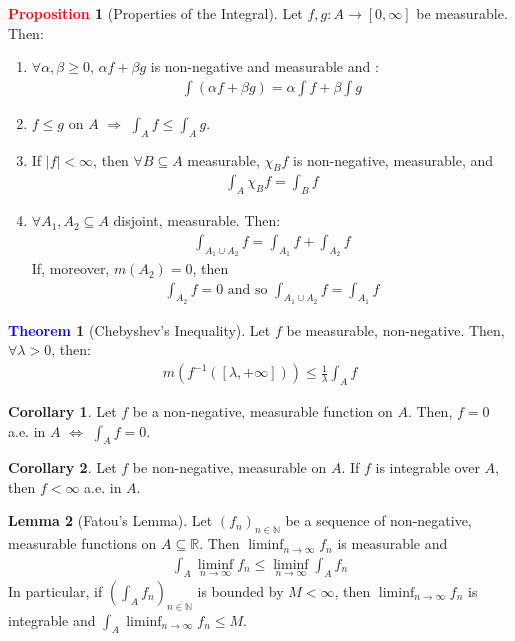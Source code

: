\documentclass[reqno,11pt]{amsart}
\theoremstyle{definition}
\newcommand{\bb}[1]{\mathbb{#1}}
\newtheorem{theorem}{\textcolor{blue}{Theorem}}
\newtheorem{corollary}{Corollary}
\newtheorem{lemma}[theorem]{Lemma}
\theoremstyle{definition}
\newtheorem{prop}{\textcolor{red}{Proposition}}
\theoremstyle{remark}
\begin{document}
\begin{prop}[Properties of the Integral] Let $f, g: A \rightarrow [0, \infty]$ be measurable. Then: 
\begin{enumerate}[noitemsep]
	\item $\forall \alpha, \beta \geq 0$, $\alpha f + \beta g$ is non-negative and measurable and :
	\begin{align*}
		\int (\alpha f + \beta g) = \alpha \int f + \beta \int g 	
	\end{align*}
	\item $f \leq g$ on $A$ $\Rightarrow$ $\int_A f \leq \int_A g$. 
	\item If $|f| < \infty$, then $\forall B \subseteq A$ measurable, $\chi_B f$ is non-negative, measurable, and 
	\begin{align*}
		\int_A \chi_B f = \int_B f 	
	\end{align*}
	\item $\forall A_1, A_2 \subseteq A$ disjoint, measurable. Then: 
	\begin{align*}
		\int_{A_1 \cup A_2} f = \int_{A_1} f + \int_{A_2} f 	
	\end{align*}
	If, moreover, $m(A_2) = 0$, then
	\begin{align*}
		\int_{A_2} f = 0 \mbox{ and so } \int_{A_1 \cup A_2}f = \int_{A_1} f	
	\end{align*}
\end{enumerate}
\end{prop}


\begin{theorem}[Chebyshev's Inequality] 
	Let $f$ be measurable, non-negative. Then, $\forall \lambda > 0$, then: 
	\begin{align*}
		m (f^{-1}([\lambda, + \infty] )) \leq \frac{1}{\lambda} \int_A f 	
	\end{align*}
\end{theorem}

\begin{corollary}
	Let $f$ be a non-negative, measurable function on $A$. Then, $f = 0$ a.e. in $A$ $\iff$ $\int_A f = 0$. 
\end{corollary}

\begin{corollary}
	Let $f$ be non-negative, measurable on $A$. If $f$ is integrable over $A$, then $f < \infty$ a.e. in $A$. 
\end{corollary}

\begin{lemma}[Fatou's Lemma] 
	Let $(f_n)_{n \in \bb{N}}$ be a sequence of non-negative, measurable functions on $A \subseteq \bb{R}$. Then $\liminf_{n \rightarrow \infty} f_n $ is measurable and 
	\begin{align}
		\int_A \liminf_{n \rightarrow \infty} f_n \leq \liminf_{n \rightarrow \infty} \int_A f_n 
	\end{align}
	In particular, if $(\int_A f_n)_{n \in \bb{N}}$ is bounded by $M < \infty$, then $\liminf_{n \rightarrow \infty} f_n$ is integrable and $\int_A \liminf_{n \rightarrow \infty} f_n \leq M$. 
\end{lemma}
\end{document}
